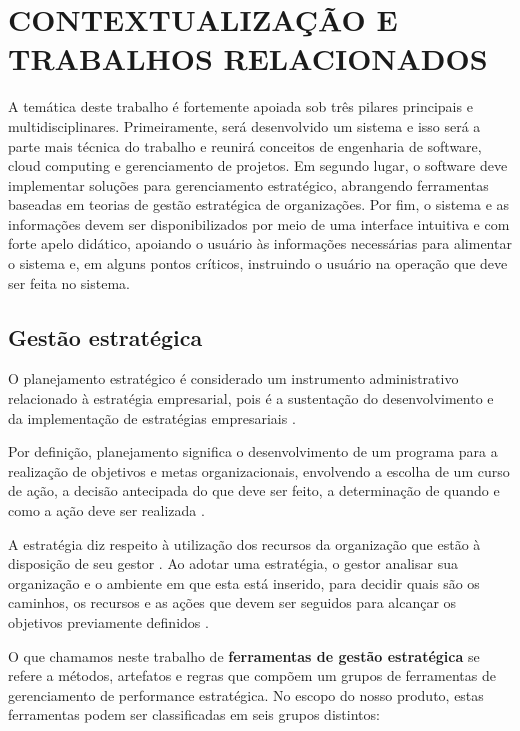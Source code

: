 \documentclass{abnt}
\begin{document}
\chapter{CONTEXTUALIZAÇÃO E TRABALHOS RELACIONADOS}

A temática deste trabalho é fortemente apoiada sob três pilares principais e
multidisciplinares. Primeiramente, será desenvolvido um sistema e isso será a
parte mais técnica do trabalho e reunirá conceitos de engenharia de software,
cloud computing e gerenciamento de projetos. Em segundo lugar, o software deve
implementar soluções para gerenciamento estratégico, abrangendo ferramentas
baseadas em teorias de gestão estratégica de organizações. Por fim, o sistema e
as informações devem ser disponibilizados por meio de uma interface intuitiva e
com forte apelo didático, apoiando o usuário às informações necessárias para
alimentar o sistema e, em alguns pontos críticos, instruindo o usuário na
operação que deve ser feita no sistema.

\section{Gestão estratégica}

O planejamento estratégico é considerado um instrumento administrativo
relacionado à estratégia empresarial, pois é a sustentação do desenvolvimento e
da implementação de estratégias empresariais \cite{OLIVEIRA1991}. 

Por definição, planejamento significa o desenvolvimento de um programa para a
realização de objetivos e metas organizacionais, envolvendo a escolha de um
curso de ação, a decisão antecipada do que deve ser feito, a determinação de
quando e como a ação deve ser realizada \cite{anaTerence}. 

A estratégia diz respeito à utilização dos recursos da organização que estão à
disposição de seu gestor \cite{ansoff1991nova}. Ao adotar uma estratégia, o
gestor analisar sua organização e o ambiente em que esta está inserido, para
decidir quais são os caminhos, os recursos e as ações que devem ser seguidos
para alcançar os objetivos previamente definidos \cite{anaTerence}.

O que chamamos neste trabalho de \textbf{ferramentas de gestão estratégica} se
refere a métodos, artefatos e regras que compõem um grupos de ferramentas de
gerenciamento de performance estratégica. No escopo do nosso produto, estas
ferramentas podem ser classificadas em seis grupos distintos:
\end{document}
